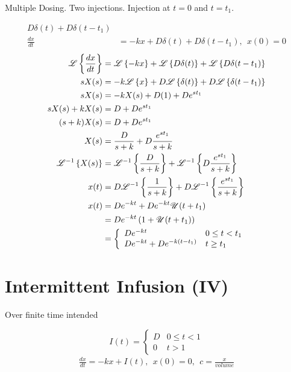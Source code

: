 \documentclass[
	date={September 16{,} 2024}
]{math486notes}
\begin{document}
Multiple Dosing. Two injections. Injection at $t=0$ and $t=t_{1}$.

\begin{equation*}
\begin{aligned}
	D\delta(t) + D\delta(t - t_{1})&\\
	\frac{dx}{dt} &= -kx + D\delta(t) + D\delta(t - t_{1}),\ \ x(0) = 0
\end{aligned}
\end{equation*}
\begin{equation*}
\begin{aligned}
	\laplace[\frac{dx}{dt}] &= \laplace[-kx] + \laplace[D\delta(t)] + \laplace[D\delta(t - t_{1})]\\
	sX(s) &= -k\laplace[x] + D\laplace[\delta(t)] + D\laplace[\delta(t - t_{1})]\\
	sX(s) &= -kX(s) + D(1) + De^{st_{1}}\\
	sX(s) + kX(s) &= D + De^{st_{1}}\\
	(s+k)X(s) &= D + De^{st_{1}}\\
	X(s) &= \frac{D}{s+k} + D\frac{e^{st_{1}}}{s+k}\\
	\laplacei[X(s)] &= \laplacei[\frac{D}{s+k}] + \laplacei[D\frac{e^{st_{1}}}{s+k}]\\
	x(t) &= D\laplacei[\frac{1}{s+k}] + D\laplacei[\frac{e^{st_{1}}}{s+k}]\\
	x(t) &= De^{-kt} + De^{-kt}\unitstep(t+t_{1})\\
		 &= De^{-kt} \left(1 + \unitstep(t+t_{1}) \right)\\
		 &= \left\{ \begin{array}{ll}
		 	De^{-kt} & 0 \leq t < t_{1}\\
			De^{-kt} + De^{-k(t-t_{1})} & t \geq t_{1}
		 \end{array} \right.
\end{aligned}
\end{equation*}

\section{Intermittent Infusion (IV)}\label{sec:intermittent-infusion}
Over finite time intended

\[ I(t) = \left\{ \begin{array}{cl}
	D & 0 \leq t < 1\\
	0 & t > 1
\end{array} \right. \]
\begin{equation*}
\begin{aligned}
	\frac{dx}{dt} = -kx + I(t),\ \ x(0) = 0,\ \ c = \frac{x}{volume}
\end{aligned}
\end{equation*}
\end{document}
